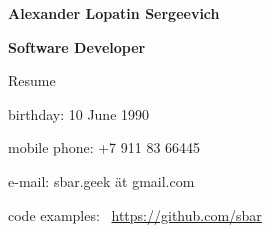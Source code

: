 \begin{center}
\fontsize{16pt}{12pt}\selectfont
\bfseries Alexander Lopatin Sergeevich\mdseries

\fontsize{12pt}{12pt}\selectfont
\bfseries Software Developer\mdseries

Resume
\end{center}
{
\fontsize{11pt}{8pt}\selectfont
\begin{center}
\item birthday: 10 June 1990
\item mobile phone: +7 911 83 66445
\item e-mail: sbar.geek ät gmail.com
\item code examples: \
\href{https://github.com/sbar?tab=repositories}{https://github.com/sbar}
\end{center}
}


